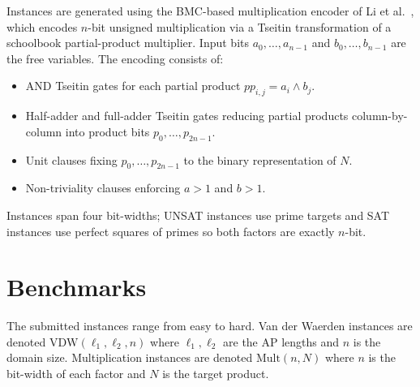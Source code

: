 \documentclass[conference]{IEEEtran}
\begin{document}
Instances are generated using the BMC-based multiplication encoder of Li et al.\ \cite{b7},
which encodes $n$-bit unsigned multiplication via a Tseitin transformation \cite{b5}
of a schoolbook partial-product multiplier. Input bits $a_0,\ldots,a_{n-1}$ and
$b_0,\ldots,b_{n-1}$ are the free variables. The encoding consists of:
\begin{itemize}
  \item AND Tseitin gates for each partial product $pp_{i,j} = a_i \wedge b_j$.
  \item Half-adder and full-adder Tseitin gates reducing partial products
        column-by-column into product bits $p_0,\ldots,p_{2n-1}$.
  \item Unit clauses fixing $p_0,\ldots,p_{2n-1}$ to the binary representation of $N$.
  \item Non-triviality clauses enforcing $a > 1$ and $b > 1$.
\end{itemize}
Instances span four bit-widths; UNSAT instances use prime targets and
SAT instances use perfect squares of primes so both factors are exactly $n$-bit.

\section{Benchmarks}

The submitted instances range from easy to hard. Van der Waerden instances
are denoted $\mathrm{VDW}(\ell_1, \ell_2, n)$ where $\ell_1, \ell_2$ are the
AP lengths and $n$ is the domain size. Multiplication instances are denoted
$\mathrm{Mult}(n, N)$ where $n$ is the bit-width of each factor and $N$ is
the target product.
\end{document}
